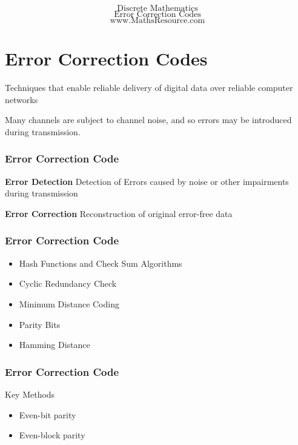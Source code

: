 \documentclass{beamer}
\begin{document}
\begin{frame}
{
\huge
\[ \mbox{Discrete Mathematics} \]
\[ \mbox{Error Correction Codes} \]
}
{
\Large
\[ \mbox{www.MathsResource.com} \]
}
\end{frame}
\section{Error Correction Codes}
Techniques that enable reliable delivery of digital data over reliable computer networks

Many channels are subject to channel noise, and so errors may be introduced during transmission.

\begin{frame}
\frametitle{Error Correction Code}
\Large

\textbf{Error Detection}
Detection of Errors caused by noise or other impairments during transmission

\textbf{Error Correction}
Reconstruction of original error-free data

\end{frame}
\begin{frame}
\frametitle{Error Correction Code}
\Large
\begin{itemize}
\item Hash Functions and Check Sum Algorithms 
\item Cyclic Redundancy Check
\item Minimum Distance Coding
\item Parity Bits
\item Hamming Distance
\end{itemize}

\end{frame}
\begin{frame}
\frametitle{Error Correction Code}
\Large

Key Methods
\begin{itemize}
\item Even-bit parity
\item Even-block parity
\end{itemize}
\end{frame}
\end{document}
